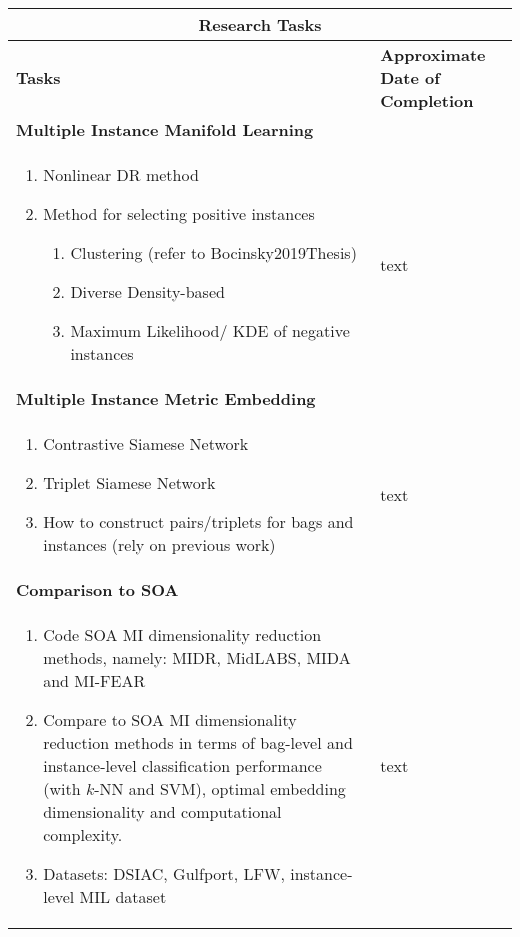 \begin{table}[H]
	\caption[List of Research Tasks]{List of research tasks and their corresponding locations in the dissertation document.}
	\label{tab:future_tasks}
	\begin{longtable}{ |p{10cm}|p{4cm}|  } 
		\hline
		\multicolumn{2}{|c|}{\textbf{Research Tasks}} \\
		\hline
		\hline
		\textbf{Tasks} & \textbf{Approximate Date of Completion}\\
		\hline
		\multicolumn{2}{|l|}{\textbf{Multiple Instance Manifold Learning}} \\
		\hline
		\begin{enumerate}
			\item Nonlinear DR method
			\item Method for selecting positive instances
			\begin{enumerate}
				\item Clustering (refer to Bocinsky2019Thesis)
				\item Diverse Density-based
				\item Maximum Likelihood/ KDE of negative instances
			\end{enumerate}
		\end{enumerate} & text\\
		\hline
		\multicolumn{2}{|l|}{\textbf{Multiple Instance Metric Embedding}} \\
		\hline
		\begin{enumerate}
			\item Contrastive Siamese Network
			\item Triplet Siamese Network
			\item How to construct pairs/triplets for bags and instances (rely on previous work) 
		\end{enumerate} & text\\
		\hline
		\multicolumn{2}{|l|}{\textbf{Comparison to SOA}} \\
		\hline
		\begin{enumerate}
			\item Code SOA MI dimensionality reduction methods, namely: MIDR, MidLABS, MIDA and MI-FEAR
			\item Compare to SOA MI dimensionality reduction methods in terms of bag-level and instance-level classification performance (with $k$-NN and SVM), optimal embedding dimensionality and computational complexity.
			\item  Datasets: DSIAC, Gulfport, LFW, instance-level MIL dataset
		\end{enumerate} & text\\
		\hline 
	\end{longtable}
\end{table}

